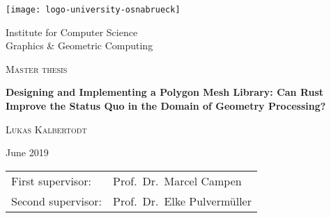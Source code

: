 \begin{titlepage}
  \begin{center}
  \vspace{4mm}
  \texttt{[image: logo-university-osnabrueck]}
  \vspace{4mm}

  \Large{Institute for Computer Science}\\[2mm]
  \Large{Graphics \& Geometric Computing}


  \vspace{25mm}

  \LARGE{\textsc{Master thesis}}

  \vspace{3mm}

  \Huge{\textsf{\textbf{
    Designing and Implementing a Polygon Mesh Library: Can Rust Improve the Status
    Quo in the Domain of Geometry Processing?
  }}}


  \vfill

  \LARGE{\textsc{Lukas Kalbertodt}}

  \vspace{5mm}

  \large{June 2019}
  \vfill

  \begin{tabular}{ll}
    First supervisor:  & Prof.\ Dr.\ Marcel Campen \\
    Second supervisor: & Prof.\ Dr.\ Elke Pulvermüller
  \end{tabular}
  \end{center}
\end{titlepage}
